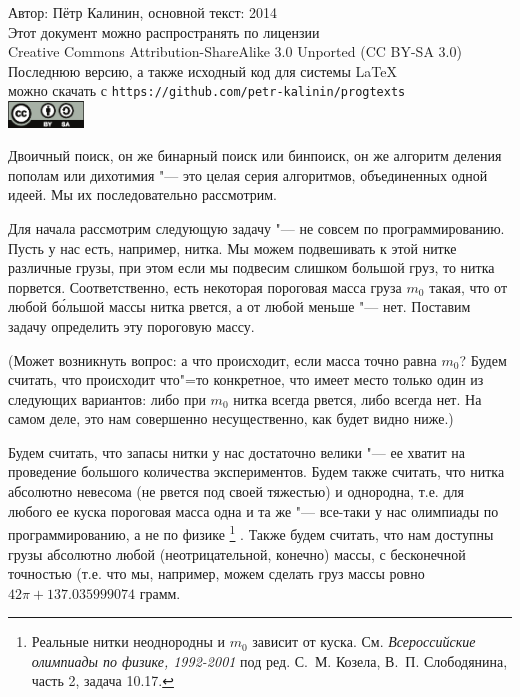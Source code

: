 \documentclass[a4paper,10pt]{problems}
\begin{document}
\begin{flushright}
Автор: Пётр Калинин, основной текст: 2014\\
Этот документ можно распространять по лицензии\\
Creative Commons Attribution-ShareAlike 3.0 Unported (CC BY-SA 3.0)\\
Последнюю версию, а также исходный код для системы \LaTeX\\
можно скачать с \verb`https://github.com/petr-kalinin/progtexts`\\
\includegraphics[width=2cm]{by-sa-corr.eps}
\end{flushright}


Двоичный поиск, он же бинарный поиск или бинпоиск, он же алгоритм деления пополам или дихотимия "--- это целая серия алгоритмов, объединенных одной идеей. 
Мы их последовательно рассмотрим.


Для начала рассмотрим следующую задачу "--- не совсем по программированию. Пусть у нас есть, например, нитка. 
Мы можем подвешивать к этой нитке различные грузы, при этом если мы подвесим слишком большой груз, то нитка порвется. 
Соответственно, есть некоторая пороговая масса груза $m_0$ такая, что от любой б\'{о}льшой массы нитка рвется, а от любой меньше "--- нет.
Поставим задачу определить эту пороговую массу.

(Может возникнуть вопрос: а что происходит, если масса точно равна $m_0$? 
Будем считать, что происходит что"=то конкретное, что имеет место только один из следующих вариантов: либо при $m_0$ нитка всегда рвется, либо всегда нет.
На самом деле, это нам совершенно несущественно, как будет видно ниже.)

Будем считать, что запасы нитки у нас достаточно велики "--- ее хватит на проведение большого количества экспериментов.
Будем также считать, что нитка абсолютно невесома (не рвется под своей тяжестью) и однородна, 
т.е. для любого ее куска пороговая масса одна и та же "--- все-таки у нас олимпиады по программированию, а не по физике%
\footnote{Реальные нитки неоднородны и $m_0$ зависит от куска. 
См. \textit{Всероссийские олимпиады по физике, 1992-2001} под ред. С.~М. Козела, В.~П. Слободянина, часть 2, задача 10.17.}%
.
Также будем считать, что нам доступны грузы абсолютно любой (неотрицательной, конечно) массы, с бесконечной точностью 
(т.е. что мы, например, можем сделать груз массы ровно $42\pi+137.035999074$ грамм.
\end{document}
